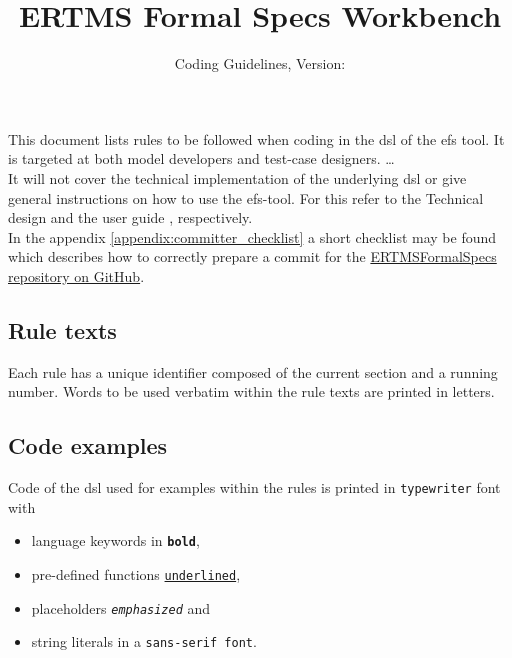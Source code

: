 \documentclass[draft]{efsguide}
\renewcommand{\docTitle}{ERTMS Formal Specs Workbench}
\renewcommand{\docSubTitle}{Coding Guidelines}
\begin{document}
\title{\docTitle}
\subtitle{\docSubTitle, Version: \vhCurrentVersion}
\date{\vhCurrentDate}
\author{\vhListAllAuthorsLongWithAbbrev}
\maketitle

\begin{versionhistory}
\end{versionhistory}



\newpage
\tableofcontents
\newpage



This document lists rules to be followed when coding in the \gls{dsl} of the \gls{efs} tool. It is targeted at both model developers and test-case designers. \ldots\\
It will not cover the technical implementation of the underlying \gls{dsl} or give general instructions on how to use the \gls{efs}-tool. For this refer to the Technical design \cite{efstechdesign} and the user guide \cite{efsuserguide}, respectively.\\

In the appendix \ref{appendix:committer_checklist} a short checklist may be found which describes how to correctly prepare a commit for the \href{https://github.com/openETCS/ERTMSFormalSpecs/}{ERTMSFormalSpecs repository on GitHub}.\\




\subsection*{Rule texts}
Each rule has a unique identifier composed of the current section and a running number. Words to be used verbatim within the rule texts are printed in  letters. 

\subsection*{Code examples}
Code of the \gls{dsl} used for examples within the rules is printed in \texttt{typewriter} font with 
\begin{itemize}
\item language keywords in \texttt{\textbf{bold}},
\item pre-defined functions \texttt{\underline{underlined}},
\item placeholders \texttt{\emph{emphasized}} and
\item string literals in a \texttt{\textsf{sans-serif font}}.
\end{itemize}
\end{document}
